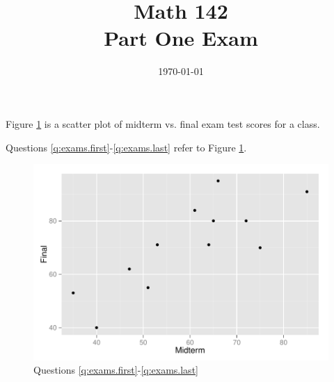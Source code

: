 \documentclass[letterpaper, landscape]{exam}
\title{Math 142 \\ Part One Exam}
\date{\today}
\author{}
\begin{document}
  \maketitle



  Figure \ref{fig:exams} is a scatter plot of midterm vs. final exam test scores
  for a class.

  Questions \ref{q:exams.first}-\ref{q:exams.last} refer to Figure \ref{fig:exams}.  

  \begin{figure}[H]
    \centering
    \includegraphics[scale = 0.5]{figures/exams_scatter.pdf}
    \caption{Questions \ref{q:exams.first}-\ref{q:exams.last}}
    \label{fig:exams}
  \end{figure}
\end{document}
